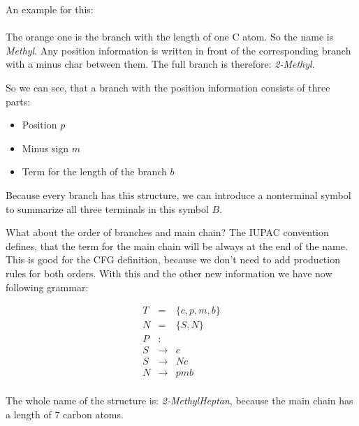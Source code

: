 \documentclass[a4paper,10pt]{article}
\begin{document}
\noindent An example for this: \\
 \\
The orange one is the branch with the length of one C atom. So the name is \emph{Methyl}. Any position information is written in front of the corresponding branch with a minus char between them. The full branch is therefore: \emph{2-Methyl}.

So we can see, that a branch with the position information consists of three parts:
\begin{itemize}
\item Position $p$
\item Minus sign $m$
\item Term for the length of the branch $b$
\end{itemize}
Because every branch has this structure, we can introduce a nonterminal symbol to summarize all three terminals in this symbol $B$.

What about the order of branches and main chain? The IUPAC convention defines, that the term for the main chain will be always at the end of the name. This is good for the CFG definition, because we don't need to add production rules for both orders. With this and the other new information we have now following grammar:

$$
\begin{aligned}
    T &=& \{c, p, m, b\} \\
    N &=& \{S, N\} \\
    P &:& \\
    S &\rightarrow& c \\
    S &\rightarrow& Nc \\
    N &\rightarrow& pmb \\
\end{aligned}
$$

The whole name of the structure is: \emph{2-MethylHeptan}, because the main chain has a length of 7 carbon atoms.
\end{document}
